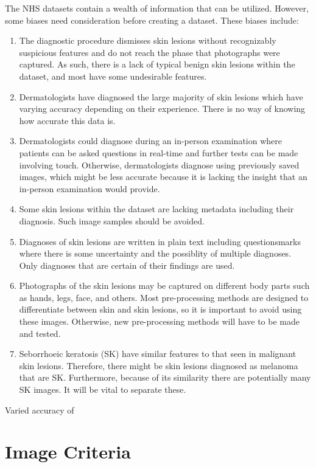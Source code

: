 The NHS datasets contain a wealth of information that can be utilized. However, some biases need consideration before creating a dataset. These biases include:
\begin{enumerate}
    \item  The diagnostic procedure dismisses skin lesions without recognizably suspicious features and do not reach the phase that photographs were captured. As such, there is a lack of typical benign skin lesions within the dataset, and most have some undesirable features.
    \item Dermatologists have diagnosed the large majority of skin lesions which have varying accuracy depending on their experience. There is no way of knowing how accurate this data is.
    \item Dermatologists could diagnose during an in-person examination where patients can be asked questions in real-time and further tests can be made involving touch. Otherwise, dermatologists diagnose using previously saved images, which might be less accurate because it is lacking the insight that an in-person examination would provide.
    \item Some skin lesions within the dataset are lacking metadata including their diagnosis. Such image samples should be avoided.
    \item Diagnoses of skin lesions are written in plain text including questionsmarks where there is some uncertainty and the possiblity of multiple diagnoses. Only diagnoses that are certain of their findings are used.
    \item Photographs of the skin lesions may be captured on different body parts such as hands, legs, face, and others. Most pre-processing methods are designed to differentiate between skin and skin lesions, so it is important to avoid using these images. Otherwise, new pre-processing methods will have to be made and tested.
    \item Seborrhoeic keratosis (SK) have similar features to that seen in malignant skin lesions. Therefore, there might be skin lesions diagnosed as melanoma that are SK. Furthermore, because of its similarity there are potentially many SK images. It will be vital to separate these.
\end{enumerate}

Varied accuracy of

\section{Image Criteria}



